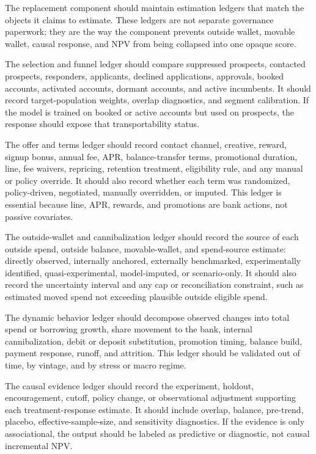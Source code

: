 \documentclass[11pt]{article}
\newcommand{\1}{\mathbf{1}}
\begin{document}
The replacement component should maintain estimation ledgers that match the
objects it claims to estimate. These ledgers are not separate governance
paperwork; they are the way the component prevents outside wallet, movable
wallet, causal response, and NPV from being collapsed into one opaque score.

The selection and funnel ledger should compare suppressed prospects,
contacted prospects, responders, applicants, declined applications, approvals,
booked accounts, activated accounts, dormant accounts, and active incumbents.
It should record target-population weights, overlap diagnostics, and segment
calibration. If the model is trained on booked or active accounts but used on
prospects, the response should expose that transportability status.

The offer and terms ledger should record contact channel, creative, reward,
signup bonus, annual fee, APR, balance-transfer terms, promotional duration,
line, fee waivers, repricing, retention treatment, eligibility rule, and any
manual or policy override. It should also record whether each term was
randomized, policy-driven, negotiated, manually overridden, or imputed. This
ledger is essential because line, APR, rewards, and promotions are bank
actions, not passive covariates.

The outside-wallet and cannibalization ledger should record the source of each
outside spend, outside balance, movable-wallet, and spend-source estimate:
directly observed, internally anchored, externally benchmarked,
experimentally identified, quasi-experimental, model-imputed, or scenario-only.
It should also record the uncertainty interval and any cap or reconciliation
constraint, such as estimated moved spend not exceeding plausible outside
eligible spend.

The dynamic behavior ledger should decompose observed changes into total spend
or borrowing growth, share movement to the bank, internal cannibalization,
debit or deposit substitution, promotion timing, balance build, payment
response, runoff, and attrition. This ledger should be validated out of time,
by vintage, and by stress or macro regime.

The causal evidence ledger should record the experiment, holdout,
encouragement, cutoff, policy change, or observational adjustment supporting
each treatment-response estimate. It should include overlap, balance,
pre-trend, placebo, effective-sample-size, and sensitivity diagnostics. If the
evidence is only associational, the output should be labeled as predictive or
diagnostic, not causal incremental NPV.
\end{document}
